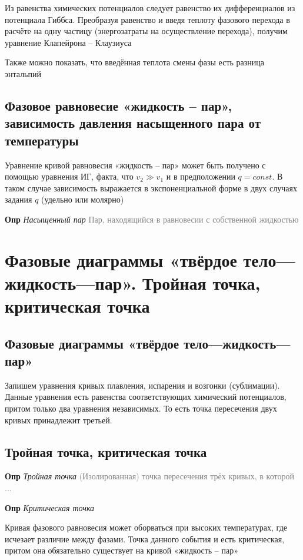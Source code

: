 \documentclass[a4paper, 14pt]{article}
\begin{document}
    Из равенства химических потенциалов следует равенство их дифференциалов из потенциала Гиббса.
    Преобразуя равенство и введя теплоту фазового перехода в расчёте на одну частицу (энергозатраты на осуществление
    перехода), получим уравнение Клапейрона -- Клаузиуса

    Также можно показать, что введённая теплота смены фазы есть разница энтальпий

    \subsection{Фазовое равновесие «жидкость -- пар», зависимость давления насыщенного пара от температуры}

    Уравнение кривой равновесия «жидкость -- пар» может быть получено с помощью уравнения ИГ, факта, что $v_2 \gg
    v_1$ и в предположении $q = const$.
    В таком случае зависимость выражается в экспоненциальной форме в двух случаях задания $q$ (удельно или молярно)

    \textbf{Опр} \textit{Насыщенный пар} \textcolor{gray}{Пар, находящийся в равновесии с собственной жидкостью}

    \section{Фазовые диаграммы «твёрдое тело—жидкость—пар».
    Тройная точка, критическая точка}

    \subsection{Фазовые диаграммы «твёрдое тело—жидкость—пар»}

    Запишем уравнения кривых плавления, испарения и возгонки (сублимации).
    Данные уравнения есть равенства соответствующих химический потенциалов, притом только два уравнения независимых.
    То есть точка пересечения двух кривых принадлежит третьей.

    \subsection{Тройная точка, критическая точка}

    \textbf{Опр} \textit{Тройная точка} \textcolor{gray}{(Изолированная) точка пересечения трёх кривых, в которой ...}

    \textbf{Опр} \textit{Критическая точка}

    Кривая фазового равновесия может оборваться при высоких температурах, где исчезает различие между фазами.
    Точка данного события и есть критическая, притом она обязательно существует на кривой «жидкость -- пар»
\end{document}

